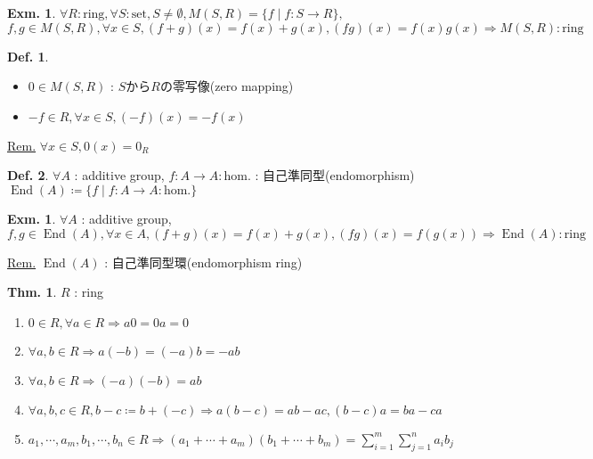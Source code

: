 \documentclass[uplatex,dvipdfmx,9pt]{beamer}
\newcommand{\End}{\operatorname{End}}
\renewcommand{\hom}{\text{hom.}} %
\newcounter{textExmCount}
\theoremstyle{definition} %
\newtheorem{defn}{Def.}[subsection] %
\newtheorem{thm}{Thm.}[subsection] %
\theoremstyle{example}
\newtheorem{exmText}[textExmCount]{Exm.}
\begin{document}
      \begin{frame}

        \begin{exmText}
          $\forall R : \text{ring}, \forall S : \text{set}, S \ne \emptyset, M(S, R) = \{f \mid f\colon S \to R\},$ \\
          $f, g \in M(S, R), \forall x \in S, (f + g)(x) = f(x) + g(x), (fg)(x) = f(x)g(x) \Rightarrow M(S, R) : \text{ring}$
        \end{exmText}

        \begin{defn}
          \begin{itemize}
            \item $0 \in M(S, R)$ : $S$から$R$の\alert{零写像(zero mapping)}
            \item $-f \in R, \forall x \in S, (-f)(x) = -f(x)$
          \end{itemize}
        \end{defn}
        \underline{Rem.} $\forall x \in S, 0(x) = 0_R$

        \begin{defn}
          $\forall A$ : additive group, $f\colon A \to A : \hom$ : \alert{自己準同型(endomorphism)} \\
          $\End(A) \coloneqq \{f \mid f\colon A \to A : \hom \}$
        \end{defn}

        \begin{exmText}
          $\forall A$ : additive group, \\
          $f, g \in \End(A), \forall x \in A, (f + g)(x) = f(x) + g(x), (fg)(x) = f(g(x)) \Rightarrow \End(A) : \text{ring}$
        \end{exmText}
        \underline{Rem.} $\End(A)$ : \alert{自己準同型環(endomorphism ring)}
        
      \end{frame}

      \begin{frame}

        \begin{thm}
          $R$ : ring
          \begin{enumerate}
            \item $0 \in R, \forall a \in R \Rightarrow a0 = 0a = 0$ 
            \item $\forall a, b \in R \Rightarrow a(-b) = (-a)b = -ab$
            \item $\forall a, b \in R \Rightarrow (-a)(-b) = ab$
            \item $\forall a, b, c \in R, b-c \coloneqq b+(-c) \Rightarrow a(b-c) = ab - ac, (b-c)a = ba - ca$
            \item $a_1, \cdots, a_m, b_1, \cdots, b_n \in R \Rightarrow (a_1 + \cdots + a_m)(b_1 + \cdots + b_m) = \displaystyle\sum_{i=1}^m\sum_{j=1}^n a_ib_j$
          \end{enumerate}
        \end{thm}
          
      \end{frame}
\end{document}
